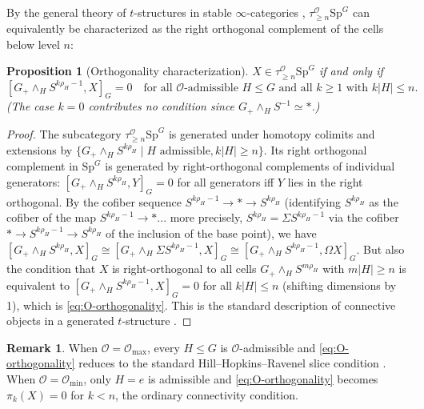 \documentclass[12pt]{article}
\newtheorem{proposition}[theorem]{Proposition}
\theoremstyle{definition}
\newtheorem{remark}[theorem]{Remark}
\newcommand{\calO}{\mathcal{O}}
\newcommand{\SpG}{\mathrm{Sp}^G}
\begin{document}
By the general theory of $t$-structures in stable $\infty$-categories \cite{LurieHA},
$\tau_{\geq n}^{\calO}\SpG$ can equivalently be characterized as the right orthogonal
complement of the cells below level $n$:

\begin{proposition}[Orthogonality characterization]
\label{prop:orthogonality}
$X \in \tau_{\geq n}^{\calO}\SpG$ if and only if
\begin{equation}
\label{eq:O-orthogonality}
  [G_+ \wedge_H S^{k\rho_H - 1}, X]_G = 0
  \quad \text{for all $\calO$-admissible $H \leq G$ and all $k \geq 1$ with $k|H| \leq n$.}
\end{equation}
(The case $k = 0$ contributes no condition since $G_+ \wedge_H S^{-1} \simeq *$.)
\end{proposition}

\begin{proof}
The subcategory $\tau_{\geq n}^{\calO}\SpG$ is generated under homotopy colimits and
extensions by $\{G_+ \wedge_H S^{k\rho_H} \mid H\text{ admissible}, k|H| \geq n\}$. Its
right orthogonal complement in $\SpG$ is generated by right-orthogonal complements of
individual generators: $[G_+ \wedge_H S^{k\rho_H}, Y]_G = 0$ for all generators iff $Y$
lies in the right orthogonal. By the cofiber sequence $S^{k\rho_H-1} \to * \to S^{k\rho_H}$
(identifying $S^{k\rho_H}$ as the cofiber of the map $S^{k\rho_H-1} \to *$... more precisely,
$S^{k\rho_H} = \Sigma S^{k\rho_H - 1}$ via the cofiber $* \to S^{k\rho_H-1} \to S^{k\rho_H}$
of the inclusion of the base point), we have
$[G_+ \wedge_H S^{k\rho_H}, X]_G \cong [G_+ \wedge_H \Sigma S^{k\rho_H - 1}, X]_G \cong
[G_+ \wedge_H S^{k\rho_H - 1}, \Omega X]_G$.
But also the condition that $X$ is right-orthogonal to all cells $G_+ \wedge_H S^{m\rho_H}$
with $m|H| \geq n$ is equivalent to $[G_+ \wedge_H S^{k\rho_H - 1}, X]_G = 0$ for all
$k|H| \leq n$ (shifting dimensions by 1), which is \eqref{eq:O-orthogonality}.
This is the standard description of connective objects in a generated $t$-structure
\cite[Definition 1.2.1.1, Proposition 1.4.4.11]{LurieHA}.
\end{proof}

\begin{remark}
When $\calO = \calO_{\max}$, every $H \leq G$ is $\calO$-admissible and \eqref{eq:O-orthogonality}
reduces to the standard Hill--Hopkins--Ravenel slice condition \cite[Definition 4.1]{HHR2016}.
When $\calO = \calO_{\min}$, only $H = e$ is admissible and \eqref{eq:O-orthogonality} becomes
$\pi_k(X) = 0$ for $k < n$, the ordinary connectivity condition.
\end{remark}
\end{document}
